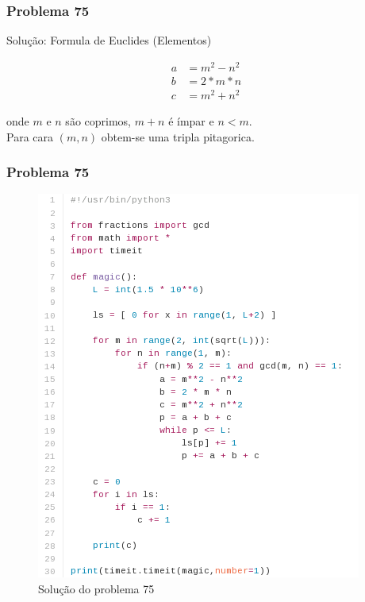 \documentclass{beamer}
\begin{document}
\begin{frame}
    \frametitle{Problema 75}

    Solução: Formula de Euclides (Elementos)

    \begin{align}
        a & = m^2 - n^2 \\
        b & = 2*m*n     \\
        c & = m^2 + n^2
    \end{align}

    onde $m$ e $n$ são coprimos, $m+n$ é ímpar e $n < m$. \\
    Para cara $(m, n)$ obtem-se uma tripla pitagorica.
\end{frame}

\begin{frame}
    \frametitle{Problema 75}

    \begin{figure}[htpb]
        \centering
        \includegraphics[height=0.75\textheight]{images/prob75.png}
        \caption{Solução do problema 75}
    \end{figure}
\end{frame}
\end{document}
